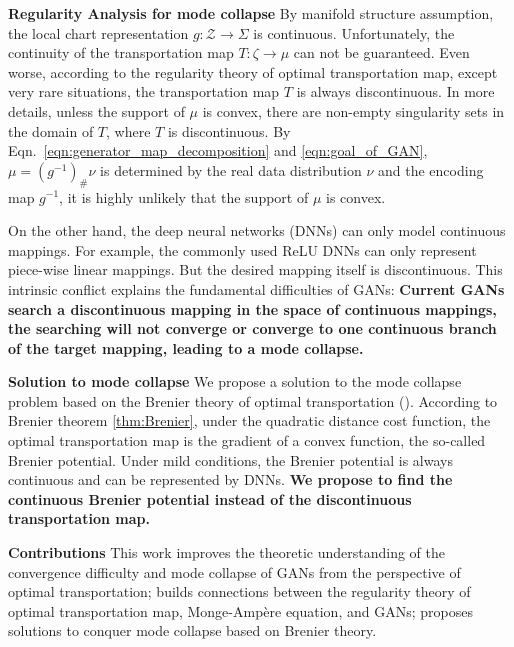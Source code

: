 \documentclass{article}
\begin{document}
\noindent\textbf{Regularity Analysis for mode collapse} By manifold structure assumption, the local chart representation $g: \mathcal{Z}\to \Sigma$ is continuous. Unfortunately, the continuity of the transportation map $T:\zeta\to \mu$ can not be guaranteed. Even worse, according to the regularity theory of optimal transportation map, except very rare situations, the transportation map $T$ is always discontinuous. In more details, unless the support of $\mu$ is convex, there are non-empty singularity sets in the domain of $T$, where $T$ is discontinuous. By Eqn.~\ref{eqn:generator_map_decomposition} and \ref{eqn:goal_of_GAN}, $\mu=(g^{-1})_\#\nu$ is determined by the real data distribution $\nu$ and the encoding map $g^{-1}$, it is highly unlikely that the support of $\mu$ is convex.

On the other hand, the deep neural networks (DNNs) can only model continuous mappings. For example, the commonly used ReLU DNNs can only represent piece-wise linear mappings. But the desired mapping  itself is discontinuous. This intrinsic conflict explains the fundamental difficulties of GANs: \textbf{Current GANs search a discontinuous mapping in the space of continuous mappings, the searching will not converge or converge to one continuous branch of the target mapping, leading to a mode collapse.}

\vspace{2mm}
\noindent\textbf{Solution to mode collapse} 
We propose a solution to the mode collapse problem based on the Brenier theory of optimal transportation (\cite{villani2008optimal}). According to Brenier theorem \ref{thm:Brenier}, under the quadratic distance cost function, the optimal transportation map is the gradient of a convex function, the so-called Brenier potential. Under mild conditions, the Brenier potential is always continuous and can be represented by DNNs. \textbf{We propose to find the continuous Brenier potential instead of the discontinuous transportation map.}

\vspace{2mm}
\noindent\textbf{Contributions}
This work improves the theoretic understanding of the convergence difficulty and mode collapse of GANs from the perspective of optimal transportation; builds connections between the regularity theory of optimal transportation map, Monge-Amp\`{e}re equation, and GANs; proposes solutions to conquer mode collapse based on Brenier theory.
\end{document}
